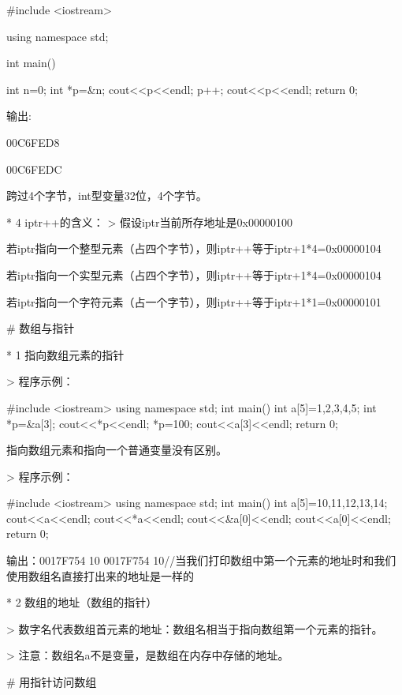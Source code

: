      #include <iostream>

     using namespace std;

     int main()

     {

        int n=0;
        int *p=&n;
        cout<<p<<endl;
        p++;
        cout<<p<<endl;
        return 0;
     }

     输出:

           00C6FED8

           00C6FEDC

           跨过4个字节，int型变量32位，4个字节。

  * 4 iptr++的含义：
     > 假设iptr当前所存地址是0x00000100

       若iptr指向一个整型元素（占四个字节），则iptr++等于iptr+1*4=0x00000104

       若iptr指向一个实型元素（占四个字节），则iptr++等于iptr+1*4=0x00000104

       若iptr指向一个字符元素（占一个字节），则iptr++等于iptr+1*1=0x00000101

   # 数组与指针

   * 1 指向数组元素的指针

      > 程序示例：

         #include <iostream>
         using namespace std;
         int main()
         {
              int a[5]={1,2,3,4,5};
              int *p=&a[3];
              cout<<*p<<endl;
              *p=100;
              cout<<a[3]<<endl;
              return 0;
         }

        指向数组元素和指向一个普通变量没有区别。


    > 程序示例：

         #include <iostream>
         using namespace std;
         int main()
         {
              int a[5]={10,11,12,13,14};
              cout<<a<<endl;
              cout<<*a<<endl;
              cout<<&a[0]<<endl;
              cout<<a[0]<<endl;
              return 0;
         }

         输出：0017F754
              10
              0017F754
              10//当我们打印数组中第一个元素的地址时和我们使用数组名直接打出来的地址是一样的


   * 2 数组的地址（数组的指针）

      > 数字名代表数组首元素的地址：数组名相当于指向数组第一个元素的指针。

      > 注意：数组名a不是变量，是数组在内存中存储的地址。


  # 用指针访问数组

